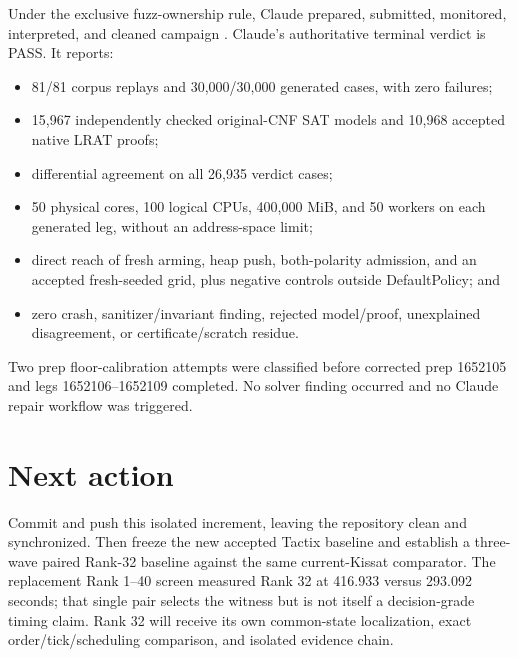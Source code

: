 \documentclass[11pt]{article}
\newcommand{\ok}{\textcolor{green!50!black}{PASS}}
\begin{document}
Under the exclusive fuzz-ownership rule, Claude prepared, submitted,
monitored, interpreted, and cleaned campaign
.
Claude's authoritative terminal verdict is \ok.  It reports:

\begin{itemize}
  \item 81/81 corpus replays and 30,000/30,000 generated cases, with zero
  failures;
  \item 15,967 independently checked original-CNF SAT models and 10,968
  accepted native LRAT proofs;
  \item differential agreement on all 26,935 verdict cases;
  \item 50 physical cores, 100 logical CPUs, 400,000 MiB, and 50 workers on
  each generated leg, without an address-space limit;
  \item direct reach of fresh arming, heap push, both-polarity admission, and
  an accepted fresh-seeded grid, plus negative controls outside DefaultPolicy;
  and
  \item zero crash, sanitizer/invariant finding, rejected model/proof,
  unexplained disagreement, or certificate/scratch residue.
\end{itemize}

Two prep floor-calibration attempts were classified before corrected prep
1652105 and legs 1652106--1652109 completed.  No solver finding occurred and
no Claude repair workflow was triggered.

\section{Next action}

Commit and push this isolated increment, leaving the repository clean and
synchronized.  Then freeze the new accepted Tactix baseline and establish a
three-wave paired Rank-32 baseline against the same current-Kissat comparator.
The replacement Rank 1--40 screen measured Rank 32 at 416.933 versus 293.092
seconds; that single pair selects the witness but is not itself a decision-grade
timing claim.  Rank 32 will receive its own common-state localization, exact
order/tick/scheduling comparison, and isolated evidence chain.
\end{document}

